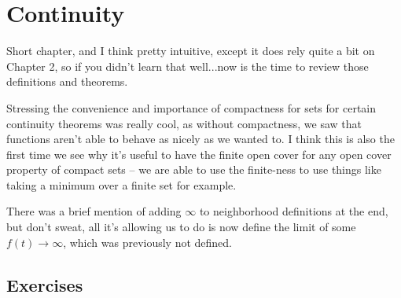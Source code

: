 \chapter{Continuity}

Short chapter, and I think pretty intuitive, except it does rely quite a bit on Chapter 2, so if you didn't learn that well...now is the time to review those definitions and theorems.

Stressing the convenience and importance of compactness for sets for certain continuity theorems was really cool, as without compactness, we saw that functions aren't able to behave as nicely as we wanted to.
I think this is also the first time we see why it's useful to have the finite open cover for any open cover property of compact sets -- we are able to use the finite-ness to use things like taking a minimum over a finite set for example.

There was a brief mention of adding $\infty$ to neighborhood definitions at the end, but don't sweat, all it's allowing us to do is now define the limit of some $f(t) \to \infty$, which was previously not defined.

\section{Exercises}

